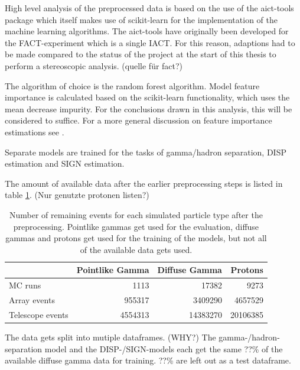 High level analysis of the preprocessed data is based on the use of
the aict-tools package \cite{aict-tools} which itself makes use of
scikit-learn \cite{sklearn_api} for the implementation of the machine learning algorithms.
The aict-tools have originally been developed for the FACT-experiment
which is a single IACT. 
For this reason,
adaptions had to be made compared to the status of the project at the start 
of this thesis to perform a stereoscopic analysis. (quelle für fact?)

The algorithm of choice is the random forest algorithm.
Model feature importance is calculated
based on the scikit-learn functionality, which
uses the mean decrease impurity.
For the conclusions drawn in this analysis,
this will be considered to suffice.
For a more general discussion on feature importance estimations see \cite{hastie2017springer}.

Separate models are trained for the tasks of gamma/hadron
separation, DISP estimation and SIGN estimation.

The amount of available data after the earlier 
preprocessing steps is listed in table \ref{tab:events_after_prep}.
(Nur genutzte protonen listen?)

\begin{table}
    \caption{Number of remaining events for each simulated particle type after the
    preprocessing. Pointlike gammas get used for the evaluation, diffuse gammas and protons
    get used for the training of the models, but not all of the available data gets used.}
    \begin{center}
        \begin{tabular}{l r r r}
            & Pointlike Gamma & Diffuse Gamma & Protons \\
            \hline
            MC runs & \num{1113} & \num{17382} &  \num{9273} \\ 
            Array events & \num{955317} & \num{3409290} & \num{4657529} \\
            Telescope events & \num{4554313} & \num{14383270} & \num{20106385} \\
        \end{tabular}
    \end{center}
    \label{tab:events_after_prep}
\end{table}

The data gets split into mutiple dataframes. (WHY?)
The gamma-/hadron-separation model and the DISP-/SIGN-models each get the same
??\% of the available diffuse gamma data for training. ??\% are left out
as a test dataframe.

